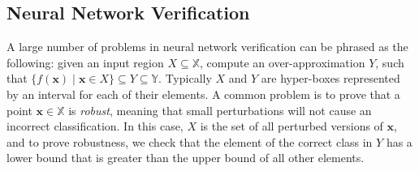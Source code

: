 \subsection{Neural Network Verification}



A large number of problems in neural network verification can be phrased as the
following:
given an input region $ X \subseteq \mathbb{X} $, compute an
over-approximation $ Y $, such that $ \{ f(\mathbf{x})\;  | \; \mathbf{x} \in X
\} \subseteq Y \subseteq \mathbb{Y} $. Typically $ X $ and $ Y
$ are hyper-boxes represented by an interval for each of their elements.
A common problem is to prove that a point $ \mathbf{x} \in
\mathbb{X} $ is \textit{robust}, meaning that small perturbations will not
cause an incorrect classification. In this case, $ X $
is the set of all perturbed versions of $ \mathbf{x} $, and
to prove robustness, we check that the element of the correct class in $ Y $
has a lower bound that is greater than the upper bound of all other elements.


